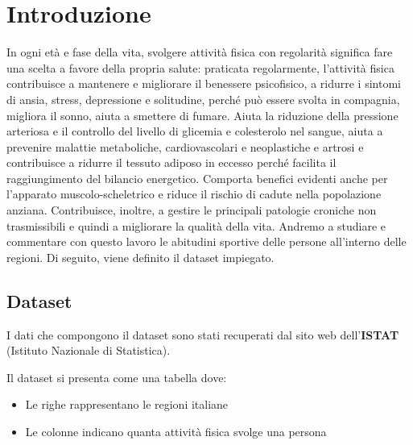 {}




\chapter{Introduzione}\label{cap1}

In ogni età e fase della vita, svolgere attività fisica con regolarità significa fare una scelta a favore della propria salute: praticata regolarmente, l’attività fisica contribuisce a mantenere e migliorare il benessere psicofisico, a ridurre i sintomi di ansia, stress, depressione e solitudine, perché può essere svolta in compagnia, migliora il sonno, aiuta a smettere di fumare. Aiuta la riduzione della pressione arteriosa e il controllo del livello di glicemia e colesterolo nel sangue, aiuta a prevenire malattie metaboliche, cardiovascolari e neoplastiche e artrosi e contribuisce a ridurre il tessuto adiposo in eccesso perché facilita il raggiungimento del bilancio energetico. Comporta benefici evidenti anche per l’apparato muscolo-scheletrico e riduce il rischio di cadute nella popolazione anziana. Contribuisce, inoltre, a gestire le principali patologie croniche non trasmissibili e quindi a migliorare la qualità della vita. Andremo a studiare e commentare con questo lavoro le abitudini sportive delle persone all'interno delle regioni.
Di seguito, viene definito il dataset impiegato.

\section{Dataset}\label{cap1.1}

I dati che compongono il dataset sono stati recuperati dal sito web dell'\textbf{ISTAT} (Istituto Nazionale di Statistica). 

Il dataset si presenta come una tabella dove:
\begin{itemize}
  \item Le righe rappresentano le regioni italiane
  \item Le colonne indicano quanta attività fisica svolge una persona
\end{itemize}


